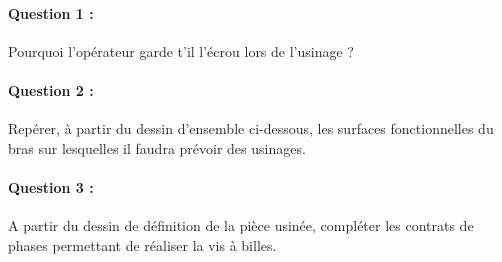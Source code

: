 \normalsize

\paragraph{Question 1 :} Pourquoi l'opérateur garde t'il l'écrou lors de l'usinage ?

\paragraph{Question 2 :} Repérer, à partir du dessin d'ensemble ci-dessous, les surfaces fonctionnelles du bras
sur lesquelles il faudra prévoir des usinages.

\paragraph{Question 3 :} A partir du dessin de définition de la pièce usinée, compléter les contrats de phases
permettant de réaliser la vis à billes.






